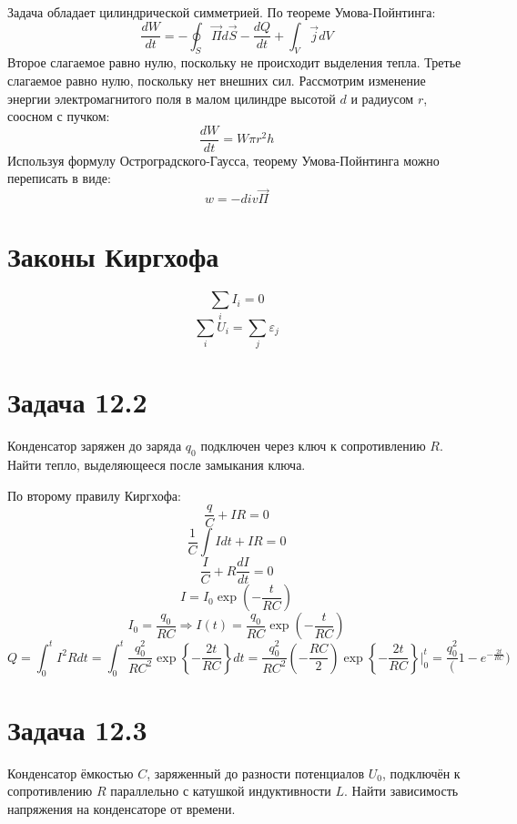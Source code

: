\documentclass[11pt]{article}
\begin{document}
Задача обладает цилиндрической симметрией. По теореме Умова-Пойнтинга:
$$\frac{dW}{dt} = -\oint_S\vec\Pi d\vec S - \frac{dQ}{dt} + \int_V\vec jdV$$
Второе слагаемое равно нулю, поскольку не происходит выделения тепла. Третье слагаемое равно нулю, поскольку нет
внешних сил. Рассмотрим изменение энергии электромагнитого поля в малом цилиндре высотой \(d\) и радиусом \(r\), соосном с пучком:
$$\frac{dW}{dt} = W\pi r^2h$$
Используя формулу Остроградского-Гаусса, теорему Умова-Пойнтинга можно переписать в виде:
$$w = -div \vec \Pi$$
\section{Законы Киргхофа}
\label{sec:org31cdba9}
$$\sum_iI_i = 0$$
$$\sum_iU_i = \sum_j\varepsilon_j$$
\section{Задача 12.2}
\label{sec:org3da61d2}
Конденсатор заряжен до заряда \(q_0\) подключен через ключ к сопротивлению \(R\). Найти тепло, выделяющееся после замыкания
ключа.

По второму правилу Киргхофа:
$$\frac{q}C + IR = 0$$
$$\frac{1}C\int Idt + IR = 0$$
$$\frac{I}{C} + R\frac{dI}{dt} = 0$$
$$I = I_0\exp\left(-\frac{t}{RC}\right)$$
$$I_0 = \frac{q_0}{RC} \Rightarrow I(t) = \frac{q_0}{RC}\exp{\left(-\frac{t}{RC}\right)}$$
$$Q = \int_0^tI^2Rdt = \int_0^t\frac{q_0^2}{RC^2}\exp\left\{-\frac{2t}{RC}\right\}dt =
\frac{q_0^2}{RC^2}\left(-\frac{RC}2\right)\exp\left\{-\frac{2t}{RC}\right\}\bigg|_0^t =
\frac{q_0^2}(1 - e^{-\frac{2t}{RC}})$$
\section{Задача 12.3}
\label{sec:orgf7484b5}
Конденсатор ёмкостью \(C\), заряженный до разности потенциалов \(U_0\), подключён к сопротивлению \(R\) параллельно с
катушкой индуктивности \(L\). Найти зависимость напряжения на конденсаторе от времени.
\end{document}
